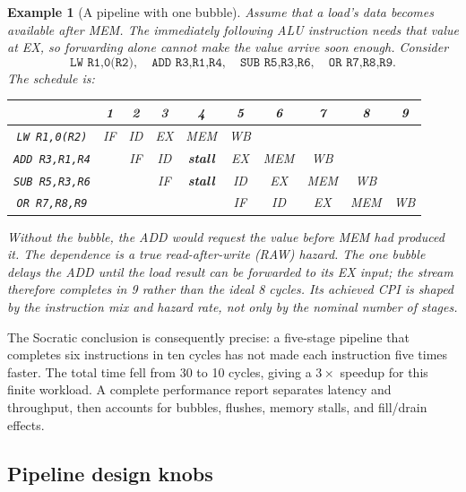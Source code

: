 \documentclass[11pt]{article}
\newtheorem{example}{Example}[section]
\begin{document}
\begin{example}[A pipeline with one bubble]
Assume that a load's data becomes available after MEM. The immediately
following ALU instruction needs that value at EX, so forwarding alone cannot
make the value arrive soon enough. Consider
\[
\texttt{LW R1,0(R2)},\quad
\texttt{ADD R3,R1,R4},\quad
\texttt{SUB R5,R3,R6},\quad
\texttt{OR R7,R8,R9}.
\]
The schedule is:
\begin{center}
\scriptsize
\begin{tabular}{@{}c|ccccccccc@{}}
\toprule
 & 1 & 2 & 3 & 4 & 5 & 6 & 7 & 8 & 9\\
\midrule
\texttt{LW R1,0(R2)} & IF & ID & EX & MEM & WB & & & &\\
\texttt{ADD R3,R1,R4} & & IF & ID & \textbf{stall} & EX & MEM & WB & &\\
\texttt{SUB R5,R3,R6} & & & IF & \textbf{stall} & ID & EX & MEM & WB &\\
\texttt{OR R7,R8,R9} & & & & & IF & ID & EX & MEM & WB\\
\bottomrule
\end{tabular}
\end{center}

Without the bubble, the ADD would request the value before MEM had produced
it. The dependence is a true read-after-write (RAW) hazard. The one bubble
delays the ADD until the load result can be forwarded to its EX input; the
stream therefore completes in 9 rather than the ideal 8 cycles. Its achieved
CPI is shaped by the instruction mix and hazard rate, not only by the nominal
number of stages.
\end{example}

The Socratic conclusion is consequently precise: a five-stage pipeline that
completes six instructions in ten cycles has not made each instruction five
times faster. The total time fell from 30 to 10 cycles, giving a $3\times$
speedup for this finite workload. A complete performance report separates
latency and throughput, then accounts for bubbles, flushes, memory stalls, and
fill/drain effects.

\subsection{Pipeline design knobs}
\end{document}
